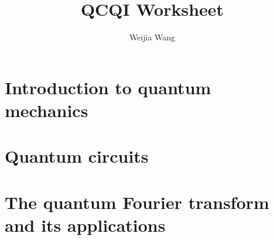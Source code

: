 \documentclass{report}
\title{QCQI Worksheet}
\author[1]{Weijia Wang}
\affil[1]{Department of Mathematics, Sorbonne University}
\theoremstyle{definition}
\theoremstyle{remark}
\begin{document}
\maketitle
\tableofcontents
\newpage

\setcounter{chapter}{1}
\chapter{Introduction to quantum mechanics}



\newpage

\newpage


\setcounter{chapter}{3}
\chapter{Quantum circuits}



\newpage

\newpage


\chapter{The quantum Fourier transform and its applications}

\newpage


\newpage

\newpage

\printbibliography
\end{document}

